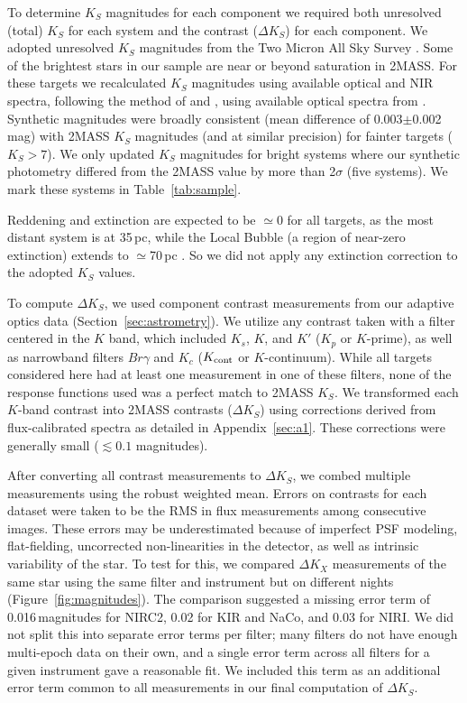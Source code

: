 \documentclass[twocolumn]{aastex62}
\begin{document}
To determine $K_S$ magnitudes for each component we required both unresolved (total) $K_S$ for each system and the contrast ($\Delta K_S$) for each component. We adopted unresolved $K_S$ magnitudes from the Two Micron All Sky Survey \citep[2MASS,][]{Skrutskie2006}. Some of the brightest stars in our sample are near or beyond saturation in 2MASS. For these targets we recalculated $K_S$ magnitudes using available optical and NIR spectra, following the method of \citet{Mann2015a} and \citet{Mann2015b}, using available optical spectra from \citet{Gaidos2014}. Synthetic magnitudes were broadly consistent (mean difference of 0.003$\pm$0.002\,mag) with 2MASS $K_S$ magnitudes (and at similar precision) for fainter targets ($K_S>7$). We only updated $K_S$ magnitudes for bright systems where our synthetic photometry differed from the 2MASS value by more than 2$\sigma$ (five systems). We mark these systems in Table~\ref{tab:sample}. 

Reddening and extinction are expected to be $\simeq$0 for all targets, as the most distant system is at 35\,pc, while the Local Bubble (a region of near-zero extinction) extends to $\simeq$70\,pc \citep{2009MNRAS.397.1286A}. So we did not apply any extinction correction to the adopted $K_S$ values.

To compute $\Delta K_S$, we used component contrast measurements from our adaptive optics data (Section~\ref{sec:astrometry}). We utilize any contrast taken with a filter centered in the $K$ band, which included $K_s$, $K$, and $K'$ ($K_p$ or $K$-prime), as well as narrowband filters $Br\gamma$ and $K_c$ ($K_{\rm{cont}}$ or $K$-continuum). While all targets considered here had at least one measurement in one of these filters, none of the response functions used was a perfect match to 2MASS $K_S$. We transformed each $K$-band contrast into 2MASS contrasts ($\Delta K_S$) using corrections derived from flux-calibrated spectra as detailed in Appendix~\ref{sec:a1}. These corrections were generally small ($\lesssim0.1$ magnitudes).

After converting all contrast measurements to $\Delta K_S$, we combed multiple measurements using the robust weighted mean. Errors on contrasts for each dataset were taken to be the RMS in flux measurements among consecutive images. These errors may be underestimated because of imperfect PSF modeling, flat-fielding, uncorrected non-linearities in the detector, as well as intrinsic variability of the star. To test for this, we compared $\Delta K_X$ measurements of the same star using the same filter and instrument but on different nights (Figure~\ref{fig:magnitudes}). The comparison suggested a missing error term of 0.016\,magnitudes for NIRC2, 0.02 for KIR and NaCo, and 0.03 for NIRI. We did not split this into separate error terms per filter; many filters do not have enough multi-epoch data on their own, and a single error term across all filters for a given instrument gave a reasonable fit. We included this term as an additional error term common to all measurements in our final computation of $\Delta K_S$.
\end{document}
